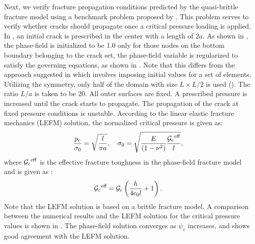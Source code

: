 Next, we verify fracture propagation conditions predicted by the quasi-brittle fracture model using a benchmark problem proposed by \citet{WILSON2016264}. This problem serves to verify whether cracks should propagate once a critical pressure loading is applied. In , an initial crack is prescribed in the center with a length of $2a$. As shown in , the phase-field is initialized to be 1.0 only for those nodes on the bottom boundary belonging to the crack set, the phase-field variable is regularized to satisfy the governing equations, as shown in . Note that this differs from the approach suggested in \cite{WILSON2016264,YOSHIOKA2020113210} which involves imposing initial values for a set of elements.
Utilizing the symmetry, only half of the domain with size $L \times L/2$ is used (). The ratio $L/a$ is taken to be 20. All outer surfaces are fixed. A prescribed pressure is increased until the crack starts to propagate. The propagation of the crack at fixed pressure conditions is unstable. According to the linear elastic fracture mechanics (LEFM) solution, the normalized critical pressure is given as:
\begin{equation}
  \dfrac{p_c}{\sigma_0} = \sqrt{\dfrac{l}{\pi a}}, \quad \sigma_0=\sqrt{\dfrac{E}{(1-\nu^2)} \dfrac{{\mathcal{G}_c}^\text{eff}}{l}},
\end{equation}
where ${\mathcal{G}_c}^\text{eff}$ is the effective fracture toughness in the phase-field fracture model and is given as \cite{Bourding2008,YOSHIOKA2020113210}:
\begin{equation}
  {\mathcal{G}_c}^\text{eff} = {\mathcal{G}_c}\left(\dfrac{h}{4c_0l}+1\right).
\end{equation}
Note that the LEFM solution is based on a brittle fracture model. A comparison between the numerical results and the LEFM solution for the critical pressure values is shown in . The phase-field solution converges as $\psi_c$ increases, and shows good agreement with the LEFM solution.

